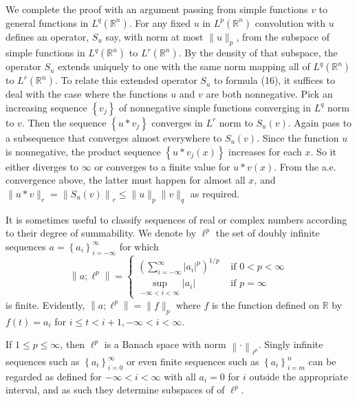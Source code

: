 \begin{para}
  We complete the proof with an argument passing from simple functions $v$ to general functions in $L^q(\mathbb{R}^n)$. For any fixed $u$ in $L^p(\mathbb{R}^n)$ convolution with $u$ defines an operator, $S_u$ say, with norm at most $\|u\|_p$, from the subspace of simple functions in $L^q(\mathbb{R}^n)$ to $L^r(\mathbb{R}^n)$. By the density of that subspace, the operator $S_u$ extends uniquely to one with the same norm mapping all of $L^q(\mathbb{R}^n)$ to $L^r(\mathbb{R}^n)$.
  To relate this extended operator $S_u$ to formula (16), it suffices to deal with the case where the functions $u$ and $v$ are both nonnegative. Pick an increasing sequence $\left\{v_j\right\}$ of nonnegative simple functions converging in $L^q$ norm to $v$. Then the sequence $\left\{u * v_j\right\}$ converges in $L^r$ norm to $S_u(v)$. Again pass to a subsequence
  that converges almost everywhere to $S_u(v)$. Since the function $u$ is nonnegative, the product sequence $\left\{u * v_j(x)\right\}$ increases for each $x$. So it either diverges to $\infty$ or converges to a finite value for $u * v(x)$. From the a.e. convergence above, the latter must happen for almost all $x$, and $\|u * v\|_r=\left\|S_u(v)\right\|_r \leq\|u\|_p\|v\|_q$ as required.
\end{para}

\begin{para}
  It is sometimes useful to classify sequences of real or complex numbers according to their degree of summability. We denote by $\ell^p$ the set of doubly infinite sequences $a=\left\{a_i\right\}_{i=-\infty}^{\infty}$ for which
  \[
  \left\|a ; \ell^p\right\|= \begin{cases}\left(\sum_{i=-\infty}^{\infty}\left|a_i\right|^p\right)^{1 / p} & \text { if } 0<p<\infty \\ \sup _{-\infty<i<\infty}\left|a_i\right| & \text { if } p=\infty\end{cases}
  \]
  is finite. Evidently, $\left\|a ; \ell^p\right\|=\|f\|_p$ where $f$ is the function defined on $\mathbb{R}$ by $f(t)=a_i$ for $i \leq t<i+1,-\infty<i<\infty$.
  
  If $1 \leq p \leq \infty$, then $\ell^p$ is a Banach space with norm $\left\|\cdot\right\|_{\ell^p}$. Singly infinite sequences such as $\left\{a_i\right\}_{i=0}^{\infty}$ or even finite sequences such as $\left\{a_i\right\}_{i=m}^n$ can be regarded as defined for $-\infty<i<\infty$ with all $a_i=0$ for $i$ outside the appropriate interval, and as such they determine subspaces of of $\ell^p$.
\end{para}

